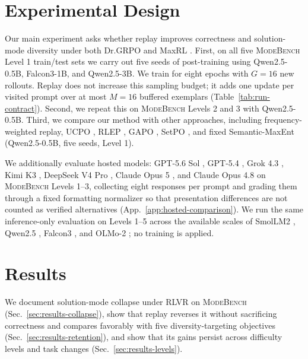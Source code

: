 \documentclass{article}
\newcommand{\1}{\mathbf 1}
\newcommand{\mb}{\textsc{ModeBench}}
\theoremstyle{remark}
\theoremstyle{definition}
\theoremstyle{plain}
\begin{document}
\section{Experimental Design}
\label{sec:experiments}
\label{sec:shared-protocol}

Our main experiment asks whether replay improves correctness and solution-mode diversity under both Dr.GRPO \citep{liu2025understanding} and MaxRL \citep{tajwar2026maxrl}.
First, on all five \mb{} Level 1 train/test sets we carry out five seeds of post-training using Qwen2.5-0.5B, Falcon3-1B, and Qwen2.5-3B. We train for eight epochs with $G=16$ new rollouts.
Replay does not increase this sampling budget; it adds one update per visited prompt over at most $M=16$ buffered exemplars (Table~\ref{tab:run-contract}).
Second, we repeat this on \mb{} Levels 2 and 3 with Qwen2.5-0.5B.
Third, we compare our method with other approaches, including frequency-weighted replay, UCPO \citep{lochab2026ucpo}, RLEP \citep{zhang2025rlep}, GAPO \citep{anschel2025groupaware}, SetPO \citep{li2026setpo}, and fixed Semantic-MaxEnt (Qwen2.5-0.5B, five seeds, Level 1).


We additionally evaluate \MDfrontierdeployments{} hosted models: GPT-5.6 Sol \citep{openai2026gpt56}, GPT-5.4 \citep{openai2026gpt54}, Grok 4.3 \citep{xai2026grok43}, Kimi K3 \citep{kimiteam2026kimik3}, DeepSeek V4 Pro \citep{deepseek2026v4pro}, Claude Opus 5 \citep{anthropic2026opus5}, and Claude Opus 4.8 \citep{anthropic2026opus48} on \mb{} Levels 1--3, collecting eight responses per prompt and grading them through a fixed formatting normalizer so that presentation differences are not counted as verified alternatives (App.~\ref{app:hosted-comparison}). We run the same inference-only evaluation on Levels 1--5 across the available scales of SmolLM2 \citep{allal2025smollm2},
Qwen2.5 \citep{yang2024qwen25}, Falcon3 \citep{falconllm2024falcon3}, and OLMo-2 \citep{olmo20242olmo2furious}; no training is applied.

\section{Results}
\label{sec:results}

We document solution-mode collapse under RLVR on \mb{} (Sec.~\ref{sec:results-collapse}), show that replay reverses it without sacrificing correctness and compares favorably with five diversity-targeting objectives (Sec.~\ref{sec:results-retention}), and show that its gains persist across difficulty levels and task changes (Sec.~\ref{sec:results-levels}).
\end{document}
